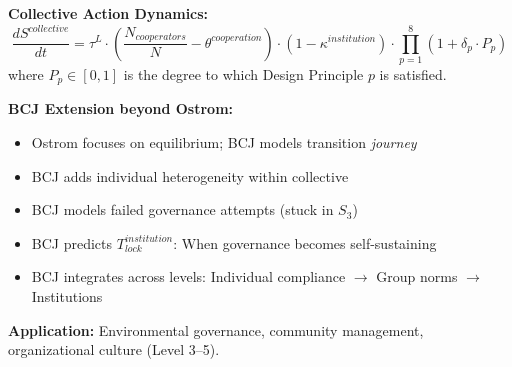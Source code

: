 \begin{tcolorbox}[colback=green!5!white, colframe=green!75!black,
    title=Theorem BCJ-T21: Ostrom Common Pool Resources as Special Case]
\textbf{Collective Action Dynamics:}
\begin{equation}
\frac{dS^{collective}}{dt} = \tau^L \cdot \left(\frac{N_{cooperators}}{N} - \theta^{cooperation}\right) \cdot (1 - \kappa^{institution}) \cdot \prod_{p=1}^{8} (1 + \delta_p \cdot P_p)
\end{equation}
where $P_p \in [0,1]$ is the degree to which Design Principle $p$ is satisfied.

\textbf{BCJ Extension beyond Ostrom:}
\begin{itemize}[nosep]
\item Ostrom focuses on equilibrium; BCJ models transition \textit{journey}
\item BCJ adds individual heterogeneity within collective
\item BCJ models failed governance attempts (stuck in $S_3$)
\item BCJ predicts $T_{lock}^{institution}$: When governance becomes self-sustaining
\item BCJ integrates across levels: Individual compliance $\to$ Group norms $\to$ Institutions
\end{itemize}

\textbf{Application:} Environmental governance, community management, organizational culture (Level 3--5).
\end{tcolorbox}


